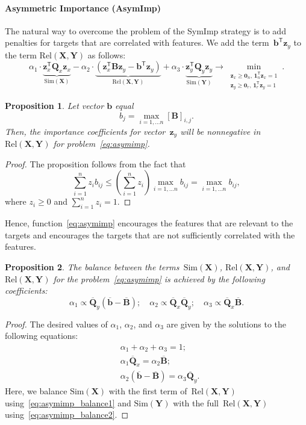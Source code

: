 \documentclass[preprint,12pt]{elsarticle}
\newtheorem{proposition}{Proposition}
\theoremstyle{definition}
\newcommand{\bz}{\mathbf{z}}
\newcommand{\bb}{\mathbf{b}}
\newcommand{\bY}{\mathbf{Y}}
\newcommand{\bX}{\mathbf{X}}
\newcommand{\bB}{\mathbf{B}}
\newcommand{\bQ}{\mathbf{Q}}
\newcommand{\T}{\mathsf{T}}
\newcommand{\bOne}{\boldsymbol{1}}
\newcommand{\bZero}{\boldsymbol{0}}
\begin{document}
\paragraph{Asymmetric Importance (AsymImp)}
The natural way to overcome the problem of the SymImp strategy is to add penalties for targets that are correlated with features.
We add the term~$\bb^{\T} \bz_y$ to the term $\text{Rel}(\bX, \bY)$ as follows:
\begin{equation}
\alpha_1 \cdot \underbrace{\bz_x^{\T} \bQ_x \bz_x}_{\text{Sim}(\bX)} - \alpha_2 \cdot  \underbrace{\left(\bz_x^{\T} \bB \bz_y - \bb^{\T} \bz_y \right) }_{\text{Rel}(\bX, \bY)} + \alpha_3 \cdot \underbrace{\bz_y^{\T} \bQ_y \bz_y}_{\text{Sim}(\bY)} \rightarrow \min_{\substack{\bz_x \geq \bZero_n, \, \bOne_n^{\T}\bz_x=1 \\ \bz_y \geq \bZero_r, \, \bOne_r^{\T}\bz_y=1}}.
\label{eq:asymimp}
\end{equation}
\begin{proposition}
	Let vector $\bb$ equal
	\begin{equation*}
	b_j = \max_{i=1, \dots n} [\bB]_{i, j}.
	\end{equation*}
	Then, the importance coefficients for vector~$\bz_y$ will be nonnegative in~$\text{Rel}(\bX, \bY)$ for problem~\eqref{eq:asymimp}.
\end{proposition}
\begin{proof}
	The proposition follows from the fact that
	\[
	\sum_{i=1}^n  z_i b_{ij} \leq \left(\sum_{i=1}^n z_i \right)\max_{i=1, \dots n} b_{ij} = \max_{i=1, \dots n} b_{ij},
	\]
	where $z_i \geq 0$ and $\sum_{i=1}^nz_i = 1$.
\end{proof}
Hence, function~\eqref{eq:asymimp} encourages the features that are relevant to the targets and encourages the targets that are not sufficiently correlated with the features. 
\begin{proposition}
	The balance between the terms~$\text{Sim}(\bX)$, $\text{Rel}(\bX, \bY)$, and $\text{Rel}(\bX, \bY)$ for the problem~\eqref{eq:asymimp} is achieved by the following coefficients:
	\begin{equation*}
	\alpha_1 \propto \overline{\bQ}_y \left( \overline{\bb} - \overline{\bB}\right); \quad
	\alpha_2 \propto \overline{\bQ}_x \overline{\bQ}_y; \quad
	\alpha_3  \propto \overline{\bQ}_x \overline{\bB}.
	\end{equation*}
\end{proposition}
\begin{proof}
	The desired values of $\alpha_1$, $\alpha_2$, and $\alpha_3$ are given by the solutions to the following equations:
	\begin{align}
	&\alpha_1 + \alpha_2 + \alpha_3 = 1; \\
	&\alpha_1 \overline{\bQ}_x = \alpha_2 \overline{\bB}; \label{eq:asymimp_balance1}\\
	&\alpha_2 \left(\overline{\bb} - \overline{\bB} \right) = \alpha_3 \overline{\bQ}_y.
	\label{eq:asymimp_balance2}
	\end{align}
	Here, we balance $\text{Sim}(\bX)$ with the first term of~$\text{Rel}(\bX, \bY)$ using~\eqref{eq:asymimp_balance1} and $\text{Sim}(\bY)$ with the full~$\text{Rel}(\bX, \bY)$ using~\eqref{eq:asymimp_balance2}.
\end{proof}
\end{document}

